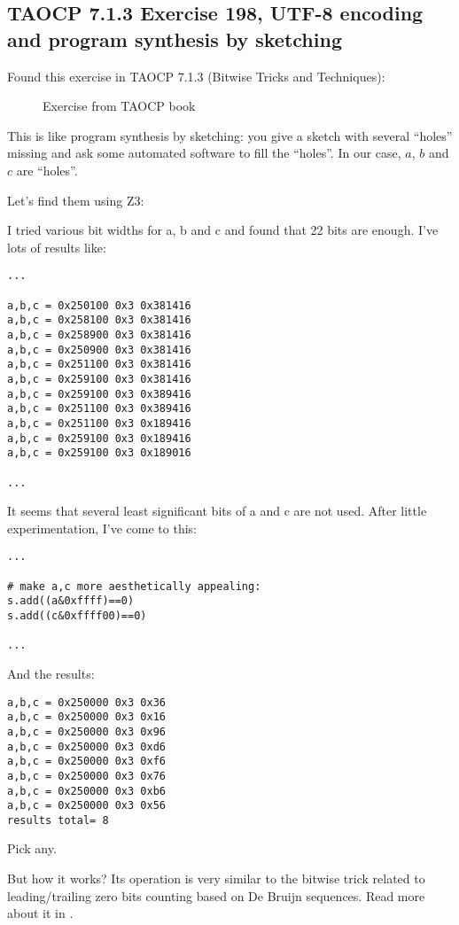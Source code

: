 \subsection{TAOCP 7.1.3 Exercise 198, UTF-8 encoding and program synthesis by sketching}

\renewcommand{\CURPATH}{synth/pgm/TAOCP_713_198}

Found this exercise in TAOCP 7.1.3 (Bitwise Tricks and Techniques):

\begin{figure}[H]
\centering
{}
\caption{Exercise from TAOCP book}
\end{figure}

This is like program synthesis by sketching: you give a sketch with several ``holes'' missing and ask some
automated software to fill the ``holes''.
In our case, $a$, $b$ and $c$ are ``holes''.

Let's find them using Z3:



I tried various bit widths for a, b and c and found that 22 bits are enough.
I've lots of results like:

\begin{lstlisting}
...

a,b,c = 0x250100 0x3 0x381416
a,b,c = 0x258100 0x3 0x381416
a,b,c = 0x258900 0x3 0x381416
a,b,c = 0x250900 0x3 0x381416
a,b,c = 0x251100 0x3 0x381416
a,b,c = 0x259100 0x3 0x381416
a,b,c = 0x259100 0x3 0x389416
a,b,c = 0x251100 0x3 0x389416
a,b,c = 0x251100 0x3 0x189416
a,b,c = 0x259100 0x3 0x189416
a,b,c = 0x259100 0x3 0x189016

...
\end{lstlisting}

It seems that several least significant bits of a and c are not used.
After little experimentation, I've come to this:

\begin{lstlisting}
...

# make a,c more aesthetically appealing:
s.add((a&0xffff)==0)
s.add((c&0xffff00)==0)

...
\end{lstlisting}

And the results:

\begin{lstlisting}
a,b,c = 0x250000 0x3 0x36
a,b,c = 0x250000 0x3 0x16
a,b,c = 0x250000 0x3 0x96
a,b,c = 0x250000 0x3 0xd6
a,b,c = 0x250000 0x3 0xf6
a,b,c = 0x250000 0x3 0x76
a,b,c = 0x250000 0x3 0xb6
a,b,c = 0x250000 0x3 0x56
results total= 8
\end{lstlisting}

Pick any.

But how it works?
Its operation is very similar to the bitwise trick related to leading/trailing zero bits counting based on De Bruijn sequences.
Read more about it in \MathForProg.

